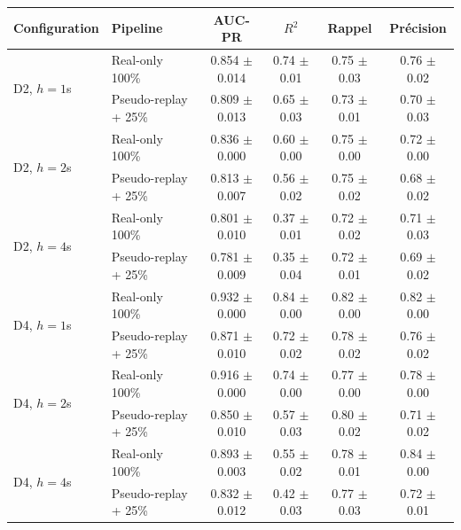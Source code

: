 \begin{tabular}{llcccc}
\toprule
Configuration & Pipeline & AUC-PR & $R^2$ & Rappel & Précision \\
\midrule
\multirow{2}{*}{D2, $h=1$s} & Real-only 100\% & 0.854 $\pm$ 0.014 & 0.74 $\pm$ 0.01 & 0.75 $\pm$ 0.03 & 0.76 $\pm$ 0.02 \\
 & Pseudo-replay + 25\% & 0.809 $\pm$ 0.013 & 0.65 $\pm$ 0.03 & 0.73 $\pm$ 0.01 & 0.70 $\pm$ 0.03 \\
\midrule
\multirow{2}{*}{D2, $h=2$s} & Real-only 100\% & 0.836 $\pm$ 0.000 & 0.60 $\pm$ 0.00 & 0.75 $\pm$ 0.00 & 0.72 $\pm$ 0.00 \\
 & Pseudo-replay + 25\% & 0.813 $\pm$ 0.007 & 0.56 $\pm$ 0.02 & 0.75 $\pm$ 0.02 & 0.68 $\pm$ 0.02 \\
\midrule
\multirow{2}{*}{D2, $h=4$s} & Real-only 100\% & 0.801 $\pm$ 0.010 & 0.37 $\pm$ 0.01 & 0.72 $\pm$ 0.02 & 0.71 $\pm$ 0.03 \\
 & Pseudo-replay + 25\% & 0.781 $\pm$ 0.009 & 0.35 $\pm$ 0.04 & 0.72 $\pm$ 0.01 & 0.69 $\pm$ 0.02 \\
\midrule
\multirow{2}{*}{D4, $h=1$s} & Real-only 100\% & 0.932 $\pm$ 0.000 & 0.84 $\pm$ 0.00 & 0.82 $\pm$ 0.00 & 0.82 $\pm$ 0.00 \\
 & Pseudo-replay + 25\% & 0.871 $\pm$ 0.010 & 0.72 $\pm$ 0.02 & 0.78 $\pm$ 0.02 & 0.76 $\pm$ 0.02 \\
\midrule
\multirow{2}{*}{D4, $h=2$s} & Real-only 100\% & 0.916 $\pm$ 0.000 & 0.74 $\pm$ 0.00 & 0.77 $\pm$ 0.00 & 0.78 $\pm$ 0.00 \\
 & Pseudo-replay + 25\% & 0.850 $\pm$ 0.010 & 0.57 $\pm$ 0.03 & 0.80 $\pm$ 0.02 & 0.71 $\pm$ 0.02 \\
\midrule
\multirow{2}{*}{D4, $h=4$s} & Real-only 100\% & 0.893 $\pm$ 0.003 & 0.55 $\pm$ 0.02 & 0.78 $\pm$ 0.01 & 0.84 $\pm$ 0.00 \\
 & Pseudo-replay + 25\% & 0.832 $\pm$ 0.012 & 0.42 $\pm$ 0.03 & 0.77 $\pm$ 0.03 & 0.72 $\pm$ 0.01 \\
\bottomrule
\end{tabular}